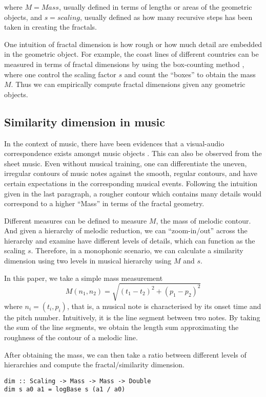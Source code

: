 \documentclass[acmsmall,review,anonymous]{acmart}\settopmatter{printfolios=true,printccs=false,printacmref=false}
\begin{document}
where $M=Mass$, usually defined in terms of lengths or areas of the geometric
objects, and $s=scaling$, usually defined as how many recursive steps has been
taken in creating the fractals.

One intuition of fractal dimension is how rough or how much detail are embedded
in the geometric object. For example, the coast lines of different countries can
be measured in terms of fractal dimensions by using the box-counting method
\cite{sarkar1994efficient}, where one control the scaling factor $s$ and count
the ``boxes'' to obtain the mass $M$. Thus we can empirically compute fractal dimensions
given any geometric objects. 

\subsection{Similarity dimension in music}
In the context of music, there have been evidences that a visual-audio
correspondence exists amongst music objects \cite{thorpe2016perception}. This
can also be observed from the sheet music. Even without musical training, one can differentiate the
uneven, irregular contours of music notes against the smooth, regular contours,
and have certain expectations in the corresponding musical events. Following the
intuition given in the last paragraph, a rougher
contour which contains many details would correspond to a higher ``Mass'' in
terms of the fractal geometry.

Different measures can be defined to measure $M$, the mass of melodic contour. And
given a hierarchy of melodic reduction, we can ``zoom-in/out'' across the
hierarchy and examine have different levels of details, which can function as the scaling $s$.
Therefore, in a monophonic scenario, we can calculate a similarity dimension
using two levels in musical hierarchy using $M$ and $s$. 

In this paper, we take a simple mass measurement
$$M(n_1, n_2) = \sqrt{(t_1-t_2)^2 +(p_1-p_2)^2}$$
  where $n_i=(t_i, p_i)$, that is, a musical note is characterised by its onset time and
the pitch number. 
Intuitively, it is the line segment between two notes. By taking the sum of the
line segments, we obtain the length sum approximating the roughness of the contour
of a melodic line. 


After obtaining the mass, we can then take a ratio between different levels of
hierarchies and compute the fractal/similarity dimension. 
\begin{verbatim}
dim :: Scaling -> Mass -> Mass -> Double
dim s a0 a1 = logBase s (a1 / a0)
\end{verbatim}
\end{document}
